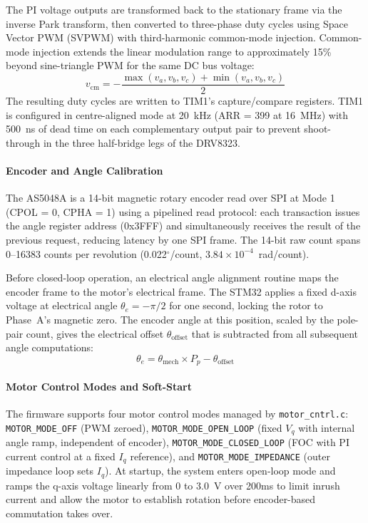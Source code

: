 \documentclass[11pt]{article}
\begin{document}
The PI voltage outputs are transformed back to the stationary frame via the inverse Park transform, then converted to three-phase duty cycles using Space Vector PWM (SVPWM) with third-harmonic common-mode injection. Common-mode injection extends the linear modulation range to approximately 15\% beyond sine-triangle PWM for the same DC bus voltage:
\begin{equation}
    v_\text{cm} = -\frac{\max(v_a, v_b, v_c) + \min(v_a, v_b, v_c)}{2}
\end{equation}
The resulting duty cycles are written to TIM1's capture/compare registers. TIM1 is configured in centre-aligned mode at 20~kHz (ARR = 399 at 16~MHz) with 500~ns of dead time on each complementary output pair to prevent shoot-through in the three half-bridge legs of the DRV8323.

\paragraph{Encoder and Angle Calibration}

The AS5048A is a 14-bit magnetic rotary encoder read over SPI at Mode 1 (CPOL = 0, CPHA = 1) using a pipelined read protocol: each transaction issues the angle register address (0x3FFF) and simultaneously receives the result of the previous request, reducing latency by one SPI frame. The 14-bit raw count spans 0--16383 counts per revolution (0.022$^\circ$/count, $3.84 \times 10^{-4}$~rad/count).

Before closed-loop operation, an electrical angle alignment routine maps the encoder frame to the motor's electrical frame. The STM32 applies a fixed d-axis voltage at electrical angle $\theta_e = -\pi/2$ for one second, locking the rotor to Phase~A's magnetic zero. The encoder angle at this position, scaled by the pole-pair count, gives the electrical offset $\theta_\text{offset}$ that is subtracted from all subsequent angle computations:
\begin{equation}
    \theta_e = \theta_\text{mech} \times P_p - \theta_\text{offset}
\end{equation}

\paragraph{Motor Control Modes and Soft-Start}

The firmware supports four motor control modes managed by \texttt{motor\_cntrl.c}: \texttt{MOTOR\_MODE\_OFF} (PWM zeroed), \texttt{MOTOR\_MODE\_OPEN\_LOOP} (fixed $V_q$ with internal angle ramp, independent of encoder), \texttt{MOTOR\_MODE\_CLOSED\_LOOP} (FOC with PI current control at a fixed $I_q$ reference), and \texttt{MOTOR\_MODE\_IMPEDANCE} (outer impedance loop sets $I_q$). At startup, the system enters open-loop mode and ramps the q-axis voltage linearly from 0 to 3.0~V over 200ms to limit inrush current and allow the motor to establish rotation before encoder-based commutation takes over.
\end{document}
